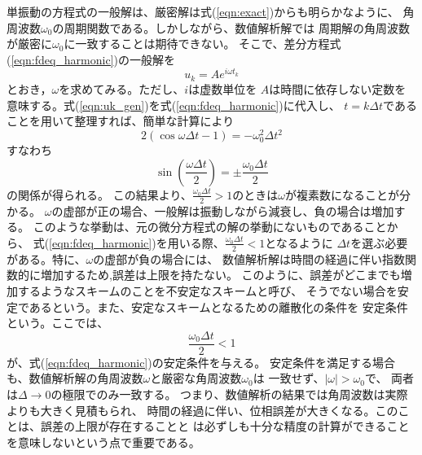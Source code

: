 \documentclass[10pt,a4j,dvipdfmx]{jarticle}
\begin{document}
単振動の方程式の一般解は、厳密解は式(\ref{eqn:exact})からも明らかなように、
角周波数$\omega_0$の周期関数である。しかしながら、数値解析解では
周期解の角周波数が厳密に$\omega_0$に一致することは期待できない。
そこで、差分方程式(\ref{eqn:fdeq_harmonic})の一般解を
\begin{equation}
	u_k=Ae^{i \omega t_k}
	\label{eqn:uk_gen}
\end{equation}
とおき，$\omega$を求めてみる。ただし、$i$は虚数単位を
$A$は時間に依存しない定数を意味する。式(\ref{eqn:uk_gen})を式(\ref{eqn:fdeq_harmonic})に代入し、
$t=k\Delta t$であることを用いて整理すれば、簡単な計算により
\begin{equation}
	2\left( \cos \omega \Delta t -1\right) =- \omega_0^2 \Delta t^2
	\label{eqn:}
\end{equation}
すなわち
\begin{equation}
	\sin \left( \frac{\omega \Delta t }{2} \right) = \pm \frac{\omega_0 \Delta t}{2} 
	\label{eqn:}
\end{equation}
の関係が得られる。
この結果より、$\frac{\omega_0\Delta t}{2}>1$のときは$\omega$が複素数になることが分かる。
$\omega$の虚部が正の場合、一般解は振動しながら減衰し、負の場合は増加する。
このような挙動は、元の微分方程式の解の挙動にないものであることから、
式(\ref{eqn:fdeq_harmonic})を用いる際、$\frac{\omega_0 \Delta t}{2}<1$となるように
$\Delta t$を選ぶ必要がある。特に、$\omega$の虚部が負の場合には、
数値解析解は時間の経過に伴い指数関数的に増加するため,誤差は上限を持たない。
このように、誤差がどこまでも増加するようなスキームのことを不安定なスキームと呼び、
そうでない場合を安定であるという。また、安定なスキームとなるための離散化の条件を
安定条件という。ここでは、
\begin{equation}
	\frac{\omega_0 \Delta t}{2} < 1
	\label{eqn:}
\end{equation}
が、式(\ref{eqn:fdeq_harmonic})の安定条件を与える。
安定条件を満足する場合も、数値解析解の角周波数$\omega$と厳密な角周波数$\omega_0$は
一致せず、$\left| \omega\right|  > \omega_0$で、
両者は$\Delta \rightarrow 0$の極限でのみ一致する。
つまり、数値解析の結果では角周波数は実際よりも大きく見積もられ、
時間の経過に伴い、位相誤差が大きくなる。このことは、誤差の上限が存在することと
は必ずしも十分な精度の計算ができることを意味しないという点で重要である。
\end{document}
